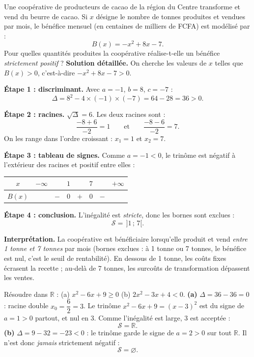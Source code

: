 \documentclass[11pt]{article}
\begin{document}
\begin{exoresolu}
Une coopérative de producteurs de cacao de la région du Centre transforme et vend du beurre de cacao. Si $x$ désigne le nombre de tonnes produites et vendues par mois, le bénéfice mensuel (en centaines de milliers de FCFA) est modélisé par :
\[ B(x)=-x^2+8x-7. \]
Pour quelles quantités produites la coopérative réalise-t-elle un bénéfice \emph{strictement positif} ?
\tcblower
\textbf{Solution détaillée.} On cherche les valeurs de $x$ telles que $B(x)>0$, c'est-à-dire $-x^2+8x-7>0$.

\textbf{Étape 1 : discriminant.} Avec $a=-1$, $b=8$, $c=-7$ :
\[ \Delta=8^2-4\times(-1)\times(-7)=64-28=36>0. \]

\textbf{Étape 2 : racines.} $\sqrt{\Delta}=6$. Les deux racines sont :
\[ \frac{-8+6}{-2}=1 \qquad \text{et} \qquad \frac{-8-6}{-2}=7. \]
On les range dans l'ordre croissant : $x_1=1$ et $x_2=7$.

\textbf{Étape 3 : tableau de signes.} Comme $a=-1<0$, le trinôme est négatif à l'extérieur des racines et positif entre elles :
\begin{center}
\begin{tabular}{|c|ccccccc|}\hline
$x$ & $-\infty$ & & $1$ & & $7$ & & $+\infty$ \\ \hline
$B(x)$ & & $-$ & $0$ & $+$ & $0$ & $-$ & \\ \hline
\end{tabular}
\end{center}

\textbf{Étape 4 : conclusion.} L'inégalité est \emph{stricte}, donc les bornes sont exclues :
\[ \mathcal{S}=\,]1\,;\,7[. \]

\textbf{Interprétation.} La coopérative est bénéficiaire lorsqu'elle produit et vend \emph{entre 1 tonne et 7 tonnes} par mois (bornes exclues : à 1 tonne ou 7 tonnes, le bénéfice est nul, c'est le seuil de rentabilité). En dessous de 1 tonne, les coûts fixes écrasent la recette ; au-delà de 7 tonnes, les surcoûts de transformation dépassent les ventes.
\end{exoresolu}

\begin{exoresolu}
Résoudre dans $\mathbb{R}$ : \quad (a) $x^2-6x+9\geq 0$ \qquad (b) $2x^2-3x+4<0$.
\tcblower
\textbf{(a)} $\Delta=36-36=0$ : racine double $x_0=\dfrac{6}{2}=3$. Le trinôme $x^2-6x+9=(x-3)^2$ est du signe de $a=1>0$ partout, et nul en $3$. Comme l'inégalité est large, $3$ est acceptée :
\[ \mathcal{S}=\mathbb{R}. \]
\textbf{(b)} $\Delta=9-32=-23<0$ : le trinôme garde le signe de $a=2>0$ sur tout $\mathbb{R}$. Il n'est donc \emph{jamais} strictement négatif :
\[ \mathcal{S}=\varnothing. \]
\end{exoresolu}
\end{document}
